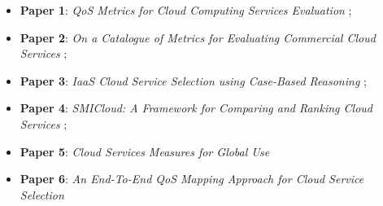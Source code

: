 \documentclass[conference]{IEEEtran}
\begin{document}
      \begin{itemize}
       \item \textbf{Paper 1}: \textit{QoS Metrics for Cloud Computing Services Evaluation} \cite{bardsiri2014};
       \item \textbf{Paper 2}: \textit{On a Catalogue of Metrics for Evaluating Commercial Cloud Services} \cite{li2012};
       \item \textbf{Paper 3}: \textit{IaaS Cloud Service Selection using Case-Based Reasoning} \cite{soltani2016};
       \item \textbf{Paper 4}: \textit{SMICloud: A Framework for Comparing and Ranking Cloud Services} \cite{garg2011};
       \item \textbf{Paper 5}: \textit{Cloud Services Measures for Global Use} \cite{siegel2012cloud}
       \item \textbf{Paper 6}: \textit{An End-To-End QoS Mapping Approach for Cloud Service Selection} \cite{karim2013}
      \end{itemize}
      
\end{document}
